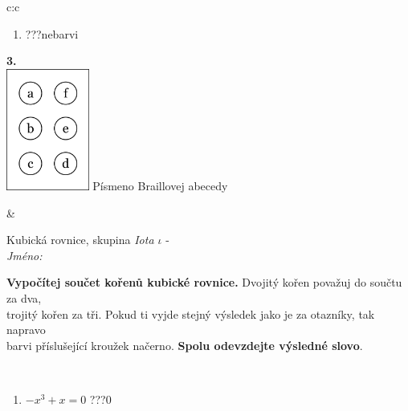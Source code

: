 \documentclass[10pt]{report}
\begin{document}
\begin{tabular}{c:c}
\begin{minipage}[c][104.5mm][t]{0.5\linewidth}
\begin{center}
\begin{minipage}{0.79\linewidth}
\begin{center}
\begin{varwidth}{\linewidth}
\begin{enumerate}
\item \quad \dotfill\; ???\;\dotfill \quad nebarvi
\end{enumerate}
\end{varwidth}
\end{center}
\end{minipage}
\begin{minipage}{0.20\linewidth}
\begin{center}
{\Huge\bfseries 3.} \\[2mm]
\includegraphics[height=40mm]{../images/braille.png}
{\small Písmeno Braillovej abecedy}
\end{center}
\end{minipage}
\end{center}
\end{minipage}
&
\begin{minipage}[c][104.5mm][t]{0.5\linewidth}
\begin{center}
\vspace{7mm}
{\huge Kubická rovnice, skupina \textit{Iota $\iota$} -}\\[5mm]
\textit{Jméno:}\phantom{xxxxxxxxxxxxxxxxxxxxxxxxxxxxxxxxxxxxxxxxxxxxxxxxxxxxxxxxxxxxxxxxx}\\[5mm]
\begin{minipage}{0.95\linewidth}
\begin{center}
\textbf{Vypočítej součet kořenů kubické rovnice.} Dvojitý kořen považuj do součtu za dva,\\trojitý kořen za tři. Pokud ti vyjde stejný výsledek jako je za otazníky, tak napravo\\barvi příslušející kroužek načerno. \textbf{Spolu odevzdejte výsledné slovo}.
\end{center}
\end{minipage}
\\[1mm]
\begin{minipage}{0.79\linewidth}
\begin{center}
\begin{varwidth}{\linewidth}
\begin{enumerate}
\Large
\item $-x^3+x=0$\quad \dotfill\; ???\;\dotfill \quad $0$

\end{enumerate}
\end{varwidth}
\end{center}
\end{minipage}
\end{center}
\end{minipage}
\end{tabular}
\end{document}
